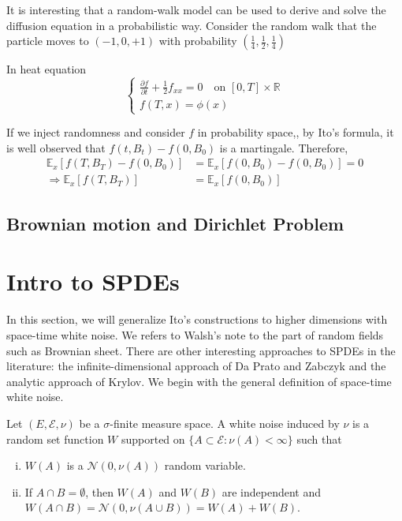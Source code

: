 \documentclass[11pt,english]{smfart}
\newcommand{\mb}{\mathbb}
\begin{document}
It is interesting that a random-walk model can be used to derive and solve the diffusion equation in a probabilistic way. Consider the random walk that the particle moves to $(-1,0,+1)$ with probability $\left(\frac{1}{4},\frac{1}{2},\frac{1}{4}\right)$

In heat equation $$\begin{cases}
    \frac{\partial f}{\partial t} + \frac{1}{2} f_{xx} = 0  \quad \text{on $[0,T]\times \mb{R}$} \\
    f(T,x) = \phi(x)
\end{cases}$$

If we inject randomness and consider $f$ in probability space,, by Ito's formula, it is well observed that $f(t,B_t) - f(0,B_0)$ is a martingale. Therefore, 
\begin{align*}
    \mb{E}_x\left[f(T,B_T) - f(0,B_0)\right] &= \mb{E}_x\left[f(0,B_0) - f(0,B_0)\right]
     = 0 \\
     \Rightarrow \mb{E}_x \left[ f(T,B_T)\right] &= \mb{E}_x\left[f(0,B_0)\right]
\end{align*}

\subsection{Brownian motion and Dirichlet Problem}


\newpage
\section{Intro to SPDEs}
In this section, we will generalize Ito's constructions to higher dimensions with space-time white noise. We refers to Walsh's note to the part of random fields such as Brownian sheet. There are other interesting approaches to SPDEs in the literature: the infinite-dimensional approach of Da Prato and Zabczyk and the analytic approach of Krylov. We begin with the general definition of space-time white noise.

Let $(E,\mathcal{E},\nu)$ be a $\sigma$-finite measure space. A white noise induced by $\nu$ is a random set function $W$ supported on $\{A\subset \mathcal{E}: \nu(A) < \infty\}$ such that
\begin{enumerate}[(i)]
    \item $W(A)$ is a $\mathcal{N}(0,\nu(A))$ random variable. 
    \item If $A \cap B =\emptyset $, then $W(A)$ and $W(B)$ are independent and $W(A\cap B) = \mathcal{N}(0,\nu(A\cup B)) = W(A) + W(B)$.
\end{enumerate}
\end{document}
